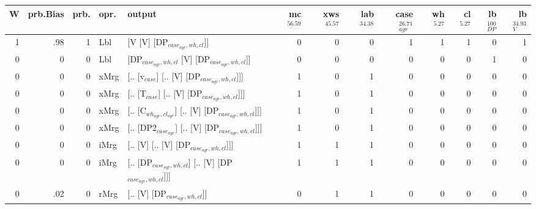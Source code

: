 \begin{tabularx}{\linewidth}{rrrlXrrrrrrrr}
\hline
   W &   prb.Bias &   prb. & opr.   & output                                                &   mc$^{56.59}$ &   xws$^{45.57}$ &   lab$^{34.38}$ &   case$_{agr}^{26.71}$ &   wh$^{5.27}$ &   cl$^{5.27}$ &   lb$_{DP}^{100}$ &   lb$_{V}^{34.93}$ \\
\hline
   1 &       .98 &   1 & Lbl  & [V [V] [DP$_{case_{agr},wh,cl}$]]                           &            0 &             0 &             0 &                  1 &           1 &           1 &                0 &              1 \\
   0 &       0 &   0 & Lbl  & [DP$_{case_{agr},wh,cl}$ [V] [DP$_{case_{agr},wh,cl}$]]           &            0 &             0 &             0 &                  0 &           0 &           0 &                1 &              0 \\
   0 &       0 &   0 & xMrg & [.. [v$_{case}$] [.. [V] [DP$_{case_{agr},wh,cl}$]]]            &            1 &             0 &             1 &                  0 &           0 &           0 &                0 &              0 \\
   0 &       0 &   0 & xMrg & [.. [T$_{case}$] [.. [V] [DP$_{case_{agr},wh,cl}$]]]            &            1 &             0 &             1 &                  0 &           0 &           0 &                0 &              0 \\
   0 &       0 &   0 & xMrg & [.. [C$_{wh_{agr},cl_{agr}}$] [.. [V] [DP$_{case_{agr},wh,cl}$]]]   &            1 &             0 &             1 &                  0 &           0 &           0 &                0 &              0 \\
   0 &       0 &   0 & xMrg & [.. [DP2$_{case_{agr}}$] [.. [V] [DP$_{case_{agr},wh,cl}$]]]      &            1 &             0 &             1 &                  0 &           0 &           0 &                0 &              0 \\
   0 &       0 &   0 & iMrg & [.. [V] [.. [V] [DP$_{case_{agr},wh,cl}$]]]                 &            1 &             1 &             1 &                  0 &           0 &           0 &                0 &              0 \\
   0 &       0 &   0 & iMrg & [.. [DP$_{case_{agr},wh,cl}$] [.. [V] [DP$_{case_{agr},wh,cl}$]]] &            1 &             1 &             1 &                  0 &           0 &           0 &                0 &              0 \\
   0 &       .02 &   0 & rMrg & [.. [V] [DP$_{case_{agr},wh,cl}$]]                          &            0 &             1 &             1 &                  0 &           0 &           0 &                0 &              0 \\
\hline
\end{tabularx}\endgroup\\
